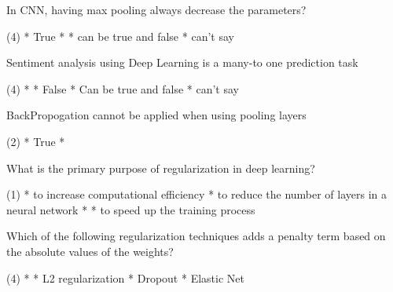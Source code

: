 \documentclass[11pt]{extarticle}
\begin{document}
\begin{exercise}
    In CNN, having max pooling always decrease the parameters?
    \begin{choice} (4)
        * True
        * 
        * can be true and false
        * can't say
    \end{choice}
\end{exercise}
\begin{solution}
\end{solution}

\begin{exercise}
    Sentiment analysis using Deep Learning is a many-to one prediction task
    \begin{choice} (4)
        * 
        * False
        * Can be true and false
        * can't say
    \end{choice}
\end{exercise}
\begin{solution}
\end{solution}


\begin{exercise}
    BackPropogation cannot be applied when using pooling layers
    \begin{choice}(2)
        * True
        * 
    \end{choice}
\end{exercise}
\begin{solution}
\end{solution}

\begin{exercise}
    What is the primary purpose of regularization in deep learning?
    \begin{choice}(1)
        * to increase computational efficiency
        * to reduce the number of layers in a neural network
        * 
        * to speed up the training process
    \end{choice}
\end{exercise}
\begin{solution}
\end{solution}

\begin{exercise}
    Which of the following regularization techniques adds a penalty term based on the absolute values of the weights?
    \begin{choice} (4)
        * 
        * L2 regularization
        * Dropout
        * Elastic Net
    \end{choice}
\end{exercise}
\begin{solution}
\end{solution}
\end{document}
